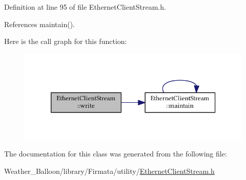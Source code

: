 Definition at line 95 of file Ethernet\+Client\+Stream.\+h.



References maintain().



Here is the call graph for this function\+:\nopagebreak
\begin{figure}[H]
\begin{center}
\leavevmode
\includegraphics[width=326pt]{class_ethernet_client_stream_aca0236433d48beb3ada438dbdb425bbd_cgraph}
\end{center}
\end{figure}




The documentation for this class was generated from the following file\+:\begin{DoxyCompactItemize}
\item 
Weather\+\_\+\+Balloon/library/\+Firmata/utility/\hyperlink{_ethernet_client_stream_8h}{Ethernet\+Client\+Stream.\+h}\end{DoxyCompactItemize}
